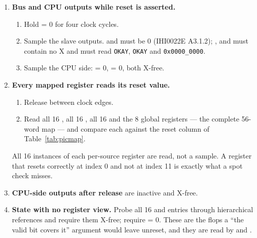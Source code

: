 \begin{enumerate}[leftmargin=*,itemsep=4pt]

\item[\textbf{1}] \textbf{Bus and CPU outputs while reset is asserted.}
\begin{enumerate}[label=1.\arabic*,leftmargin=12mm,itemsep=1pt]
  \item Hold  = 0 for four clock cycles.
  \item Sample the slave outputs.  and  must be 0
        (IHI0022E A3.1.2); ,  and  must contain
        no X and must read \texttt{OKAY}, \texttt{OKAY} and
        \texttt{0x0000\_0000}.
  \item Sample the CPU side:  = 0,  = 0, both
        X-free.
\end{enumerate}

\item[\textbf{2}] \textbf{Every mapped register reads its reset value.}
\begin{enumerate}[label=2.\arabic*,leftmargin=12mm,itemsep=1pt]
  \item Release  between clock edges.
  \item Read all 16 , all 16 , all 16
         and the 8 global registers --- the complete 56-word
        map --- and compare each against the reset column of
        Table~\ref{tab:picmap}.
\end{enumerate}
All 16 instances of each per-source register are read, not a sample. A register
that resets correctly at index 0 and not at index 11 is exactly what a spot
check misses.

\item[\textbf{3}] \textbf{CPU-side outputs after release} are inactive and
X-free.

\item[\textbf{4}] \textbf{State with no register view.} Probe all 16
 and  entries through hierarchical references and
require them X-free; require  = 0. These are the flops a ``the valid
bit covers it'' argument would leave unreset, and they are read by
 and .


\end{enumerate}
